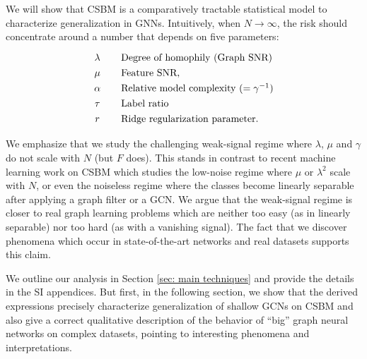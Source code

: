 \documentclass[9pt,twocolumn]{pnas-new}
\begin{document}
We will show that CSBM is a comparatively tractable statistical model to characterize generalization in GNNs. Intuitively, when $N \to \infty$, the risk should concentrate around a number that depends on five parameters:
\[\arraycolsep=10.4pt\def\arraystretch{1.3}
\begin{array}{cl}
\lambda & \text{Degree of homophily (Graph SNR)} \\
\mu       & \text{Feature SNR,} \\
\alpha   & \text{Relative model complexity } (=\gamma^{-1})\\
\tau      & \text{Label ratio} \\
r         & \text{Ridge regularization parameter.}
\end{array}
\]

We emphasize that we study the challenging weak-signal regime where $\lambda$, $\mu$ and $\gamma$ do not scale with $N$ (but $F$ does). This stands in contrast to recent machine learning work on CSBM \cite{lu2021learning, baranwal2021graph} which studies the low-noise regime where $\mu$ or $\lambda^2$ scale with $N$, or even
the noiseless regime where the classes become linearly separable after applying a graph filter or a GCN. We argue that the weak-signal regime is closer to real graph learning problems which are neither too easy (as in linearly separable) nor too hard (as with a vanishing signal). The fact that we discover phenomena which occur in state-of-the-art networks and real datasets supports this claim.

We outline our analysis in Section \ref{sec: main techniques} and provide the details in the SI appendices. But first, in the following section, we show that the derived expressions precisely characterize generalization of shallow GCNs on CSBM and also give a correct qualitative description of the behavior of ``big'' graph neural networks on complex datasets, pointing to interesting phenomena and interpretations. 
\end{document}
